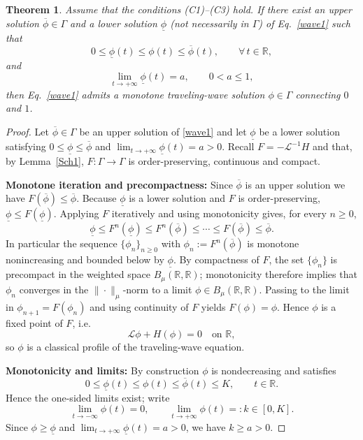 \documentclass[12pt,letterpaper]{amsart}
\newtheorem{theorem}{Theorem}[section]
\theoremstyle{definition}
\theoremstyle{remark}
\numberwithin{equation}{section}
\begin{document}
 
 \begin{theorem}\label{the main2}
 	Assume that the conditions \textup{(C1)}–\textup{(C3)} hold.  
 	If there exist an upper solution $\overline{\phi}\in\Gamma$ and a lower solution 
 	$\underline{\phi}$ (not necessarily in $\Gamma$) of Eq.~\eqref{wave1} such that
 	\[
 	0 \le \underline{\phi}(t) \le \phi(t) \le \overline{\phi}(t), 
 	\qquad \forall\, t\in\mathbb{R},
 	\]
 	and
 	\[
 	\lim_{t\to+\infty}\underline{\phi}(t)=a, \qquad 0<a\le1,
 	\]
 	then Eq.~\eqref{wave1} admits a monotone traveling-wave solution 
 	$\phi\in\Gamma$ connecting $0$ and $1$.
 \end{theorem}
 
  
 
\begin{proof}
	Let $\overline\phi\in\Gamma$ be an upper solution of \eqref{wave1} and let
	$\underline\phi$ be a lower solution satisfying $0\le\underline\phi\le\overline\phi$ and
	\(\lim_{t\to+\infty}\underline\phi(t)=a>0\).
	Recall \(F=-\mathcal L^{-1}H\) and that, by Lemma~\ref{Sch1}, \(F:\Gamma\to\Gamma\) is order-preserving, continuous and compact.
	
	\medskip\noindent\textbf{Monotone iteration and precompactness:}
	Since $\overline\phi$ is an upper solution we have \(F(\overline\phi)\le\overline\phi\). 
	Because $\underline\phi$ is a lower solution and $F$ is order-preserving, \( \underline\phi\le F(\underline\phi)\). 
	Applying $F$ iteratively and using monotonicity gives, for every \(n\ge0\),
	\[
	\underline\phi \le F^n(\underline\phi)\le F^n(\overline\phi)\le\cdots \le F(\overline\phi)\le\overline\phi.
	\]
	In particular the sequence \(\{\phi_n\}_{n\ge0}\) with \(\phi_n:=F^n(\overline\phi)\) is monotone nonincreasing and bounded below by \(\underline\phi\). 
	By compactness of \(F\), the set \(\{\phi_n\}\) is precompact in the weighted space \(B_\mu(\mathbb R,\mathbb R)\); monotonicity therefore implies that \(\phi_n\) converges in the \(\|\cdot\|_\mu\)-norm to a limit \(\phi\in B_\mu(\mathbb R,\mathbb R)\). Passing to the limit in \(\phi_{n+1}=F(\phi_n)\) and using continuity of \(F\) yields \(F(\phi)=\phi\). Hence \(\phi\) is a fixed point of \(F\), i.e.
	\[
	\mathcal L\phi + H(\phi)=0 \quad\text{on }\mathbb R,
	\]
	so \(\phi\) is a classical profile of the traveling-wave equation.
	
	\medskip\noindent\textbf{ Monotonicity and limits:}
	By construction \(\phi\) is nondecreasing and satisfies
	\[
	0\le \underline\phi(t)\le \phi(t)\le\overline\phi(t)\le K,\qquad t\in\mathbb R.
	\]
	Hence the one-sided limits exist; write
	\[
	\lim_{t\to-\infty}\phi(t)=0,\qquad \lim_{t\to+\infty}\phi(t)=:k\in[0,K].
	\]
	Since \(\phi\ge\underline\phi\) and \(\lim_{t\to+\infty}\underline\phi(t)=a>0\), we have \(k\ge a>0\).
	

\end{proof}
\end{document}
